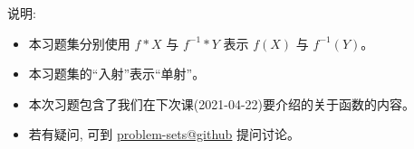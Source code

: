 \documentclass{article}
\begin{document}
说明:
\begin{itemize}
  \item 本习题集分别使用 $f \ast X$ 与 $f^{-1} \ast Y$ 表示 $f(X)$ 与 $f^{-1}(Y)$。
  \item 本习题集的``入射''表示``单射''。
  \item 本次习题包含了我们在下次课(2021-04-22)要介绍的关于函数的内容。
  \item 若有疑问, 可到 \href{https://github.com/courses-at-nju-by-hfwei/discrete-math-problem-sets/discussions}{problem-sets@github} 提问讨论。
\end{itemize}
\end{document}
